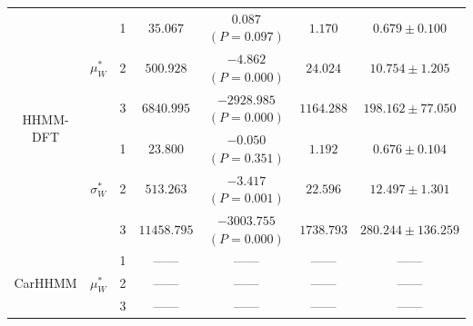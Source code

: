 \documentclass{article}
\begin{document}
\begin{center}
{\begin{tabular}{ccccccc}
\multirow{6}{*}{HHMM-DFT}   & \multirow{3}{*}{$\mu_W^*$}    & 1                                & $35.067$                         & $0.087$ $(P=0.097)$          & $1.170$                             & $0.679 \pm 0.100$                             \\
                            &                               & 2                                & $500.928$                         & $-4.862$ $(P=0.000)$          & $24.024$                             & $10.754 \pm 1.205$                             \\
                            &                               & 3                                & $6840.995$                         & $-2928.985$ $(P=0.000)$          & $1164.288$                             & $198.162 \pm 77.050$                             \\
                            & \multirow{3}{*}{$\sigma_W^*$} & 1                                & $23.800$                         & $-0.050$ $(P=0.351)$          & $1.192$                             & $0.676 \pm 0.104$                             \\
                            &                               & 2                                & $513.263$                         & $-3.417$ $(P=0.001)$          & $22.596$                             & $12.497 \pm 1.301$                             \\
                            &                               & 3                                & $11458.795$                         & $-3003.755$ $(P=0.000)$          & $1738.793$                             & $280.244 \pm 136.259$                             \\ \hline
\multirow{6}{*}{CarHHMM}    & \multirow{3}{*}{$\mu_W^*$}    & 1                                & ------                         & ------                     & ------                             & ------                                      \\
                            &                               & 2                                & ------                         & ------                     & ------                             & ------                                      \\
                            &                               & 3                                & ------                         & ------                     & ------                             & ------                                      \\

\end{tabular}}
\end{center}
\end{document}
